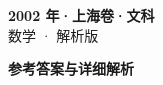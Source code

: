 \documentclass[zihao=-4, a4paper]{ctexart}
\begin{document}
\begin{center}
  {\Large\bfseries 2002 年·上海卷·文科}\\[4pt]
  {\large 数学 · 解析版}
\end{center}
\medskip
{}

\clearpage
{}
\begin{center}{\Large\bfseries 参考答案与详细解析}\end{center}
\medskip

\end{document}
